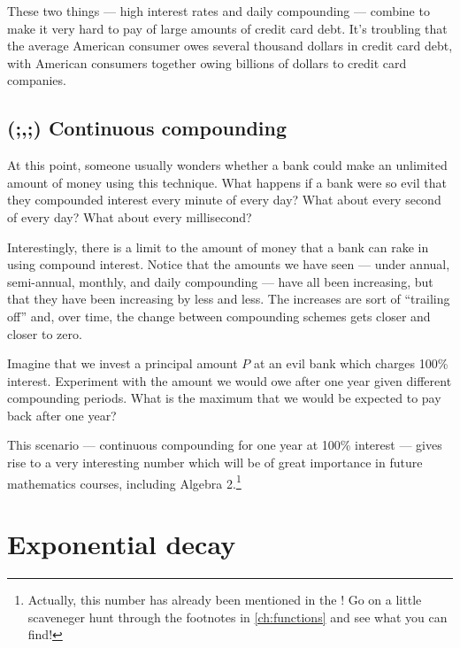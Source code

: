 These two things --- high interest rates and daily compounding --- combine to make it very hard to pay of large amounts of credit card debt. It's troubling that the average American consumer owes several thousand dollars in credit card debt, with American consumers together owing billions of dollars to credit card companies.


\subsection{(;,;) Continuous compounding}

At this point, someone usually wonders whether a bank could make an unlimited amount of money using this technique. What happens if a bank were so evil that they compounded interest every minute of every day? What about every second of every day? What about every millisecond?

Interestingly, there is a limit to the amount of money that a bank can rake in using compound interest. Notice that the amounts we have seen --- under annual, semi-annual, monthly, and daily compounding --- have all been increasing, but that they have been increasing by less and less. The increases are sort of ``trailing off'' and, over time, the change between compounding schemes gets closer and closer to zero.

\begin{boxexplore}
Imagine that we invest a principal amount $P$ at an evil bank which charges 100\% interest. Experiment with the amount we would owe after one year given different compounding periods. What is the maximum that we would be expected to pay back after one year?
\end{boxexplore}


This scenario --- continuous compounding for one year at 100\% interest --- gives rise to a very interesting number which will be of great importance in future mathematics courses, including Algebra 2.\footnote{Actually, this number has already been mentioned in the \algebranomicon! Go on a little scaveneger hunt through the footnotes in \cref{ch:functions} and see what you can find!}

\section{Exponential decay}
\label{sec:expodecay}

